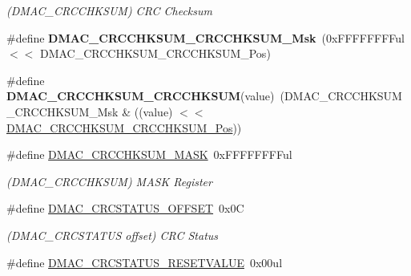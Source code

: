 \begin{DoxyCompactItemize}
\begin{DoxyCompactList}\small\item\em (D\+M\+A\+C\+\_\+\+C\+R\+C\+C\+H\+K\+S\+U\+M) C\+R\+C Checksum \end{DoxyCompactList}\item 
\hypertarget{group___s_a_m_l21___d_m_a_c_ga8d05874fe6f2273d4e5cc5515a15586c}{}\#define {\bfseries D\+M\+A\+C\+\_\+\+C\+R\+C\+C\+H\+K\+S\+U\+M\+\_\+\+C\+R\+C\+C\+H\+K\+S\+U\+M\+\_\+\+Msk}~(0x\+F\+F\+F\+F\+F\+F\+F\+Ful $<$$<$ D\+M\+A\+C\+\_\+\+C\+R\+C\+C\+H\+K\+S\+U\+M\+\_\+\+C\+R\+C\+C\+H\+K\+S\+U\+M\+\_\+\+Pos)\label{group___s_a_m_l21___d_m_a_c_ga8d05874fe6f2273d4e5cc5515a15586c}

\item 
\hypertarget{group___s_a_m_l21___d_m_a_c_ga24abec4cc6540f28fd1370688bb384d0}{}\#define {\bfseries D\+M\+A\+C\+\_\+\+C\+R\+C\+C\+H\+K\+S\+U\+M\+\_\+\+C\+R\+C\+C\+H\+K\+S\+U\+M}(value)~(D\+M\+A\+C\+\_\+\+C\+R\+C\+C\+H\+K\+S\+U\+M\+\_\+\+C\+R\+C\+C\+H\+K\+S\+U\+M\+\_\+\+Msk \& ((value) $<$$<$ \hyperlink{group___s_a_m_l21___d_m_a_c_gae067bcd8b5d57e5e006ddd8d5bf1b619}{D\+M\+A\+C\+\_\+\+C\+R\+C\+C\+H\+K\+S\+U\+M\+\_\+\+C\+R\+C\+C\+H\+K\+S\+U\+M\+\_\+\+Pos}))\label{group___s_a_m_l21___d_m_a_c_ga24abec4cc6540f28fd1370688bb384d0}

\item 
\hypertarget{group___s_a_m_l21___d_m_a_c_ga7c0021ba861b04234cc713fb97d18d48}{}\#define \hyperlink{group___s_a_m_l21___d_m_a_c_ga7c0021ba861b04234cc713fb97d18d48}{D\+M\+A\+C\+\_\+\+C\+R\+C\+C\+H\+K\+S\+U\+M\+\_\+\+M\+A\+S\+K}~0x\+F\+F\+F\+F\+F\+F\+F\+Ful\label{group___s_a_m_l21___d_m_a_c_ga7c0021ba861b04234cc713fb97d18d48}

\begin{DoxyCompactList}\small\item\em (D\+M\+A\+C\+\_\+\+C\+R\+C\+C\+H\+K\+S\+U\+M) M\+A\+S\+K Register \end{DoxyCompactList}\item 
\hypertarget{group___s_a_m_l21___d_m_a_c_gab05e9410749f64351e0e0e5428cbd63e}{}\#define \hyperlink{group___s_a_m_l21___d_m_a_c_gab05e9410749f64351e0e0e5428cbd63e}{D\+M\+A\+C\+\_\+\+C\+R\+C\+S\+T\+A\+T\+U\+S\+\_\+\+O\+F\+F\+S\+E\+T}~0x0\+C\label{group___s_a_m_l21___d_m_a_c_gab05e9410749f64351e0e0e5428cbd63e}

\begin{DoxyCompactList}\small\item\em (D\+M\+A\+C\+\_\+\+C\+R\+C\+S\+T\+A\+T\+U\+S offset) C\+R\+C Status \end{DoxyCompactList}\item 
\hypertarget{group___s_a_m_l21___d_m_a_c_gaa0c9009f518f6ae4a37ebe42ffc30007}{}\#define \hyperlink{group___s_a_m_l21___d_m_a_c_gaa0c9009f518f6ae4a37ebe42ffc30007}{D\+M\+A\+C\+\_\+\+C\+R\+C\+S\+T\+A\+T\+U\+S\+\_\+\+R\+E\+S\+E\+T\+V\+A\+L\+U\+E}~0x00ul\label{group___s_a_m_l21___d_m_a_c_gaa0c9009f518f6ae4a37ebe42ffc30007}


\end{DoxyCompactItemize}
